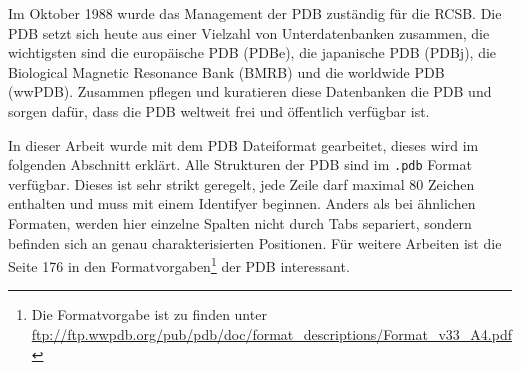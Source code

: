 
Im Oktober 1988 wurde das Management der \ac{PDB} zuständig für die \ac{RCSB}. Die \ac{PDB} setzt sich heute aus einer Vielzahl von Unterdatenbanken zusammen, die wichtigsten sind die europäische \ac{PDB} (PDBe), die japanische \ac{PDB} (PDBj), die Biological Magnetic Resonance Bank (BMRB) und die worldwide \ac{PDB} (wwPDB). Zusammen pflegen und kuratieren diese Datenbanken die \ac{PDB} und sorgen dafür, dass die \ac{PDB} weltweit frei und öffentlich verfügbar ist.


In dieser Arbeit wurde mit dem \ac{PDB} Dateiformat gearbeitet, dieses wird im folgenden Abschnitt erklärt. Alle Strukturen der \ac{PDB} sind im \texttt{.pdb} Format verfügbar. Dieses ist sehr strikt geregelt, jede Zeile darf maximal 80 Zeichen enthalten und muss mit einem Identifyer beginnen. Anders als bei ähnlichen Formaten, werden hier einzelne Spalten nicht durch Tabs separiert, sondern befinden sich an genau charakterisierten Positionen. 
Für weitere Arbeiten ist die Seite 176 in den Formatvorgaben\footnote{Die Formatvorgabe ist zu finden unter \url{ftp://ftp.wwpdb.org/pub/pdb/doc/format_descriptions/Format_v33_A4.pdf}} der \ac{PDB} interessant.


